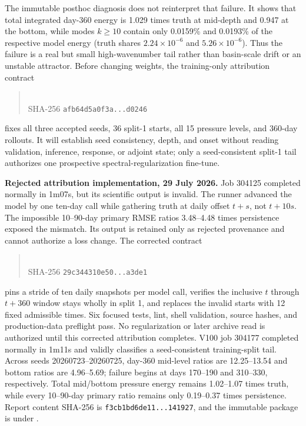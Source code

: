 \documentclass[11pt]{article}
\begin{document}
The immutable posthoc diagnosis
does not reinterpret that failure.  It shows that total integrated day-360
energy is 1.029 times truth at mid-depth and 0.947 at the bottom, while modes
\(k\geq10\) contain only 0.0159\% and 0.0193\% of the respective model energy
(truth shares \(2.24\times10^{-6}\) and \(5.26\times10^{-6}\)).  Thus the
failure is a real but small high-wavenumber tail rather than basin-scale drift
or an unstable attractor.  Before changing weights, the training-only
attribution contract
\begin{quote}
\\
SHA-256 \texttt{afb64d5a0f3a...d0246}
\end{quote}
fixes all three accepted seeds, 36 split-1 starts, all 15 pressure levels, and
360-day rollouts.  It will establish seed consistency, depth, and onset without
reading validation, inference, response, or adjoint state; only a
seed-consistent split-1 tail authorizes one prospective spectral-regularization
fine-tune.

\textbf{Rejected attribution implementation, 29 July 2026.}  Job 304125
completed normally in 1m07s, but its scientific output is invalid.  The runner
advanced the model by one ten-day call while gathering truth at daily offset
\(t+s\), not \(t+10s\).  The impossible 10--90-day primary RMSE ratios
3.48--4.48 times persistence exposed the mismatch.  Its output is retained only
as rejected provenance and cannot authorize a loss change.  The corrected
contract
\begin{quote}
\\
SHA-256 \texttt{29c344310e50...a3de1}
\end{quote}
pins a stride of ten daily snapshots per model call, verifies the inclusive
\(t\) through \(t+360\) window stays wholly in split 1, and replaces the
invalid starts with 12 fixed admissible times.  Six focused tests, lint, shell
validation, source hashes, and production-data preflight pass.  No
regularization or later archive read is authorized until this corrected
attribution completes.  V100 job 304177 completed normally in 1m11s and
validly classifies a seed-consistent training-split tail.  Across seeds
20260723--20260725, day-360 mid-level ratios are 12.25--13.54 and bottom ratios
are 4.96--5.69; failure begins at days 170--190 and 310--330, respectively.
Total mid/bottom pressure energy remains 1.02--1.07 times truth, while every
10--90-day primary ratio remains only 0.19--0.37 times persistence.  Report
content SHA-256 is \texttt{f3cb1bd6de11...141927}, and the immutable package is
under
.
\end{document}
